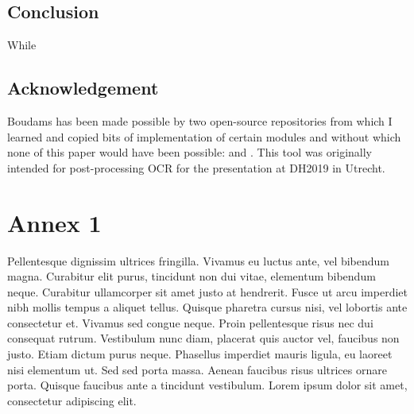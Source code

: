 \documentclass{jdmdh}
\begin{document}
\subsection{Conclusion}

While 

\subsection{Acknowledgement}

Boudams has been made possible by two open-source repositories from which I learned and copied bits of implementation of certain modules and without which none of this paper would have been possible: \citet{enrique_manjavacas_2019_2654987} and \citet{bentrevett}. This tool was originally intended for post-processing OCR for the presentation \citet{pinchecampsclerice} at DH2019 in Utrecht.






\appendix\footnotesize

\section{Annex 1}
Pellentesque dignissim ultrices fringilla. Vivamus eu luctus ante, vel bibendum magna. Curabitur elit purus, tincidunt non dui
vitae, elementum bibendum neque. Curabitur ullamcorper sit amet justo at hendrerit. Fusce ut arcu imperdiet nibh mollis
tempus a aliquet tellus. Quisque pharetra cursus nisi, vel lobortis ante consectetur et. Vivamus sed congue neque. Proin
pellentesque risus nec dui consequat rutrum. Vestibulum nunc diam, placerat quis auctor vel, faucibus non justo. Etiam
dictum purus neque. Phasellus imperdiet mauris ligula, eu laoreet nisi elementum ut. Sed sed porta massa. Aenean faucibus
risus ultrices ornare porta. Quisque faucibus ante a tincidunt vestibulum. Lorem ipsum dolor sit amet, consectetur adipiscing
elit.
\end{document}
